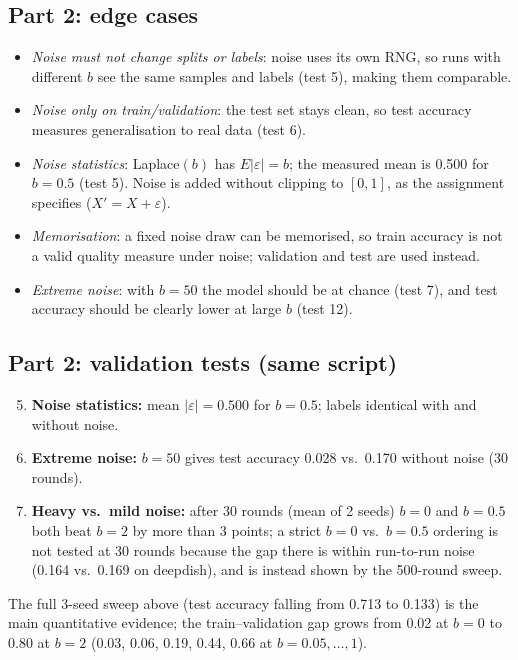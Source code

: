 \documentclass[11pt]{article}
\begin{document}
\subsection*{Part 2: edge cases}
\begin{itemize}
\item \emph{Noise must not change splits or labels}: noise uses its own RNG, so runs with different $b$ see the same samples and labels (test 5), making them comparable.
\item \emph{Noise only on train/validation}: the test set stays clean, so test accuracy measures generalisation to real data (test 6).
\item \emph{Noise statistics}: Laplace$(b)$ has $E|\varepsilon|=b$; the measured mean is 0.500 for $b{=}0.5$ (test 5). Noise is added without clipping to $[0,1]$, as the assignment specifies ($X'=X+\varepsilon$).
\item \emph{Memorisation}: a fixed noise draw can be memorised, so train accuracy is not a valid quality measure under noise; validation and test are used instead.
\item \emph{Extreme noise}: with $b{=}50$ the model should be at chance (test 7), and test accuracy should be clearly lower at large $b$ (test 12).
\end{itemize}
\subsection*{Part 2: validation tests (same script)}
\begin{enumerate}
\setcounter{enumi}{4}
\item \textbf{Noise statistics:} mean $|\varepsilon|=0.500$ for $b{=}0.5$; labels identical with and without noise.
\setcounter{enumi}{6}
\item \textbf{Extreme noise:} $b{=}50$ gives test accuracy 0.028 vs.\ 0.170 without noise (30 rounds).
\setcounter{enumi}{11}
\item \textbf{Heavy vs.\ mild noise:} after 30 rounds (mean of 2 seeds) $b{=}0$ and $b{=}0.5$ both beat $b{=}2$ by more than 3 points; a strict $b{=}0$ vs.\ $b{=}0.5$ ordering is not tested at 30 rounds because the gap there is within run-to-run noise (0.164 vs.\ 0.169 on deepdish), and is instead shown by the 500-round sweep.
\end{enumerate}
The full 3-seed sweep above (test accuracy falling from 0.713 to 0.133) is the main quantitative evidence; the train--validation gap grows from 0.02 at $b{=}0$ to 0.80 at $b{=}2$ (0.03, 0.06, 0.19, 0.44, 0.66 at $b{=}0.05,\dots,1$).
\end{document}
